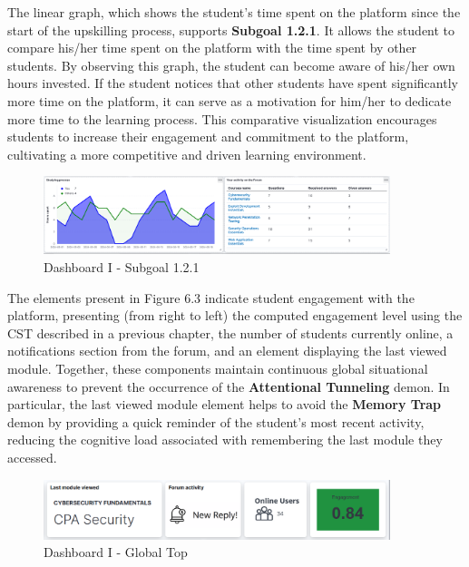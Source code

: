 The linear graph, which shows the student's time spent on the platform since the start of the upskilling process, supports \textbf{Subgoal 1.2.1}. 
It allows the student to compare his/her time spent on the platform with the time spent by other students. 
By observing this graph, the student can become aware of his/her own hours invested. 
If the student notices that other students have spent significantly more time on the platform, it can serve as a motivation for him/her to dedicate more time to the learning process. 
This comparative visualization encourages students to increase their engagement and commitment to the platform, cultivating a more competitive and driven learning environment.


\begin{figure}[H]
    \centering
    \includegraphics[width=0.9\textwidth]{assets/dashboard_1_121.png}
    \caption{Dashboard I - Subgoal 1.2.1}
    \label{fig:dashboard_1_subgoal_121}
\end{figure}

The elements present in Figure 6.3 indicate student engagement with the platform, presenting (from right to left) the computed engagement level using the CST described in a previous chapter, the number of students currently online, a notifications section from the forum, and an element displaying the last viewed module. Together, these components maintain continuous global situational awareness to prevent the occurrence of the \textbf{Attentional Tunneling} demon.
In particular, the last viewed module element helps to avoid the \textbf{Memory Trap} demon by providing a quick reminder of the student's most recent activity, reducing the cognitive load associated with remembering the last module they accessed.

\begin{figure}[H]
    \centering
    \includegraphics[width=0.9\textwidth]{assets/dashboard_1_globaltop.png}
    \caption{Dashboard I - Global Top}
    \label{fig:dashboard_1_global_top}
\end{figure}

